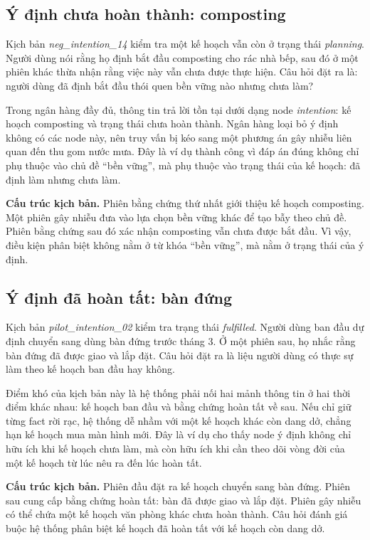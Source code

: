 \documentclass[../main.tex]{subfiles}
\begin{document}
\subsection{Ý định chưa hoàn thành: composting}
\label{app:success_composting}

Kịch bản \textit{neg\_intention\_14} kiểm tra một kế hoạch vẫn còn ở trạng thái \textit{planning}. Người dùng nói rằng họ định bắt đầu composting cho rác nhà bếp, sau đó ở một phiên khác thừa nhận rằng việc này vẫn chưa được thực hiện. Câu hỏi đặt ra là: người dùng đã định bắt đầu thói quen bền vững nào nhưng chưa làm?

Trong ngân hàng đầy đủ, thông tin trả lời tồn tại dưới dạng node \textit{intention}: kế hoạch composting và trạng thái chưa hoàn thành. Ngân hàng loại bỏ ý định không có các node này, nên truy vấn bị kéo sang một phương án gây nhiễu liên quan đến thu gom nước mưa. Đây là ví dụ thành công vì đáp án đúng không chỉ phụ thuộc vào chủ đề ``bền vững'', mà phụ thuộc vào trạng thái của kế hoạch: đã định làm nhưng chưa làm.

\textbf{Cấu trúc kịch bản.} Phiên bằng chứng thứ nhất giới thiệu kế hoạch composting. Một phiên gây nhiễu đưa vào lựa chọn bền vững khác để tạo bẫy theo chủ đề. Phiên bằng chứng sau đó xác nhận composting vẫn chưa được bắt đầu. Vì vậy, điều kiện phân biệt không nằm ở từ khóa ``bền vững'', mà nằm ở trạng thái của ý định.

\subsection{Ý định đã hoàn tất: bàn đứng}
\label{app:success_standing_desk}

Kịch bản \textit{pilot\_intention\_02} kiểm tra trạng thái \textit{fulfilled}. Người dùng ban đầu dự định chuyển sang dùng bàn đứng trước tháng 3. Ở một phiên sau, họ nhắc rằng bàn đứng đã được giao và lắp đặt. Câu hỏi đặt ra là liệu người dùng có thực sự làm theo kế hoạch ban đầu hay không.

Điểm khó của kịch bản này là hệ thống phải nối hai mảnh thông tin ở hai thời điểm khác nhau: kế hoạch ban đầu và bằng chứng hoàn tất về sau. Nếu chỉ giữ từng fact rời rạc, hệ thống dễ nhầm với một kế hoạch khác còn dang dở, chẳng hạn kế hoạch mua màn hình mới. Đây là ví dụ cho thấy node ý định không chỉ hữu ích khi kế hoạch chưa làm, mà còn hữu ích khi cần theo dõi vòng đời của một kế hoạch từ lúc nêu ra đến lúc hoàn tất.

\textbf{Cấu trúc kịch bản.} Phiên đầu đặt ra kế hoạch chuyển sang bàn đứng. Phiên sau cung cấp bằng chứng hoàn tất: bàn đã được giao và lắp đặt. Phiên gây nhiễu có thể chứa một kế hoạch văn phòng khác chưa hoàn thành. Câu hỏi đánh giá buộc hệ thống phân biệt kế hoạch đã hoàn tất với kế hoạch còn dang dở.
\end{document}
